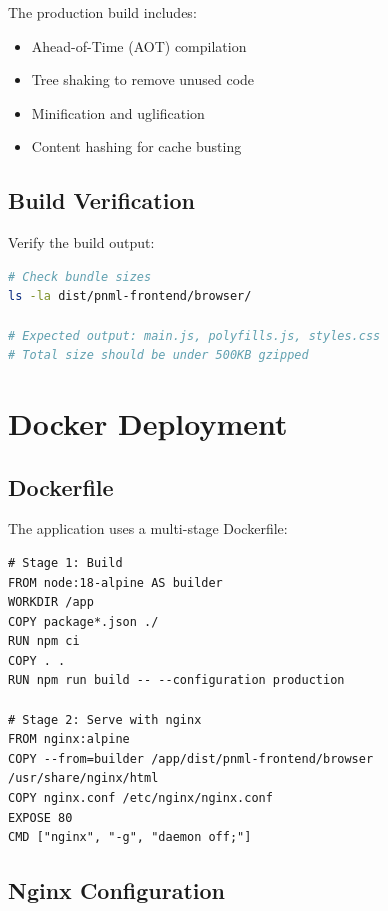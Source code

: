 The production build includes:
\begin{itemize}
    \item Ahead-of-Time (AOT) compilation
    \item Tree shaking to remove unused code
    \item Minification and uglification
    \item Content hashing for cache busting
\end{itemize}

\subsection{Build Verification}

Verify the build output:

\begin{lstlisting}[language=bash, caption={Verifying the production build}]
# Check bundle sizes
ls -la dist/pnml-frontend/browser/

# Expected output: main.js, polyfills.js, styles.css
# Total size should be under 500KB gzipped
\end{lstlisting}

\section{Docker Deployment}
\label{sec:docker-deployment}

\subsection{Dockerfile}

The application uses a multi-stage Dockerfile:

\begin{lstlisting}[language=docker, caption={Multi-stage Dockerfile}]
# Stage 1: Build
FROM node:18-alpine AS builder
WORKDIR /app
COPY package*.json ./
RUN npm ci
COPY . .
RUN npm run build -- --configuration production

# Stage 2: Serve with nginx
FROM nginx:alpine
COPY --from=builder /app/dist/pnml-frontend/browser /usr/share/nginx/html
COPY nginx.conf /etc/nginx/nginx.conf
EXPOSE 80
CMD ["nginx", "-g", "daemon off;"]
\end{lstlisting}

\subsection{Nginx Configuration}

